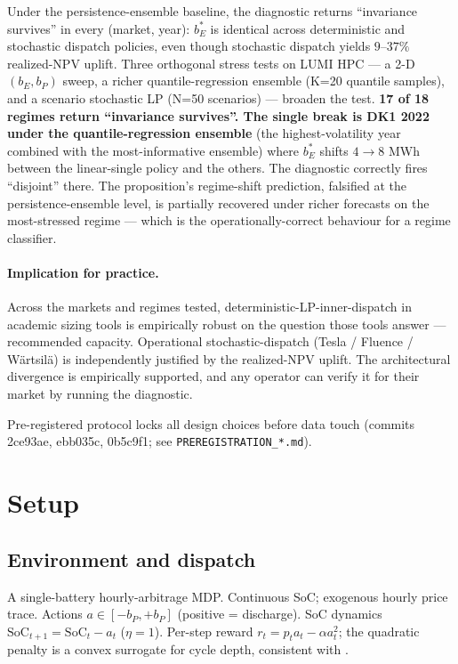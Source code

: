 \documentclass[11pt]{article}
\begin{document}
Under the persistence-ensemble baseline, the diagnostic returns ``invariance survives'' in every (market, year): $b_E^*$ is identical across deterministic and stochastic dispatch policies, even though stochastic dispatch yields $9$--$37\%$ realized-NPV uplift. Three orthogonal stress tests on LUMI HPC --- a 2-D $(b_E, b_P)$ sweep, a richer quantile-regression ensemble (K=20 quantile samples), and a scenario stochastic LP (N=50 scenarios) --- broaden the test. \textbf{17 of 18 regimes return ``invariance survives''. The single break is DK1 2022 under the quantile-regression ensemble} (the highest-volatility year combined with the most-informative ensemble) where $b_E^*$ shifts $4 \to 8$ MWh between the linear-single policy and the others. The diagnostic correctly fires ``disjoint'' there. The proposition's regime-shift prediction, falsified at the persistence-ensemble level, is partially recovered under richer forecasts on the most-stressed regime --- which is the operationally-correct behaviour for a regime classifier.

\paragraph{Implication for practice.} Across the markets and regimes tested, deterministic-LP-inner-dispatch in academic sizing tools is empirically robust on the question those tools answer --- recommended capacity. Operational stochastic-dispatch (Tesla / Fluence / W\"{a}rtsil\"{a}) is independently justified by the realized-NPV uplift. The architectural divergence is empirically supported, and any operator can verify it for their market by running the diagnostic.

Pre-registered protocol locks all design choices before data touch (commits 2ce93ae, ebb035c, 0b5c9f1; see \texttt{PREREGISTRATION\_*.md}).

\section{Setup}\label{sec:setup}

\subsection{Environment and dispatch}

A single-battery hourly-arbitrage MDP. Continuous SoC; exogenous hourly price trace. Actions $a \in [-b_P, +b_P]$ (positive = discharge). SoC dynamics $\mathrm{SoC}_{t+1} = \mathrm{SoC}_t - a_t$ ($\eta = 1$). Per-step reward $r_t = p_t a_t - \alpha a_t^2$; the quadratic penalty is a convex surrogate for cycle depth, consistent with \citet{shi2017convex}.
\end{document}

